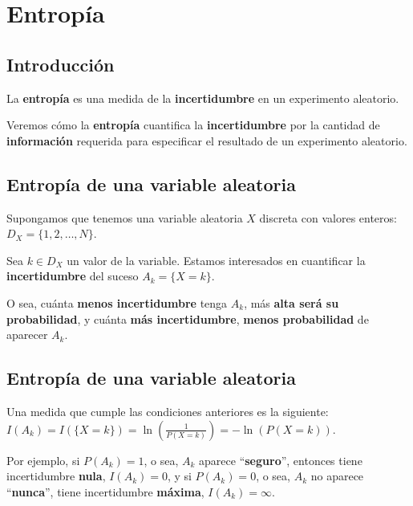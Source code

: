 \documentclass[]{book}
\begin{document}
\hypertarget{entropuxeda}{%
\section{Entropía}\label{entropuxeda}}

\hypertarget{introducciuxf3n-3}{%
\subsection{Introducción}\label{introducciuxf3n-3}}

La \textbf{entropía} es una medida de la \textbf{incertidumbre} en un experimento aleatorio.

Veremos cómo la \textbf{entropía} cuantifica la \textbf{incertidumbre} por la cantidad de \textbf{información} requerida para especificar el resultado de un experimento aleatorio.

\hypertarget{entropuxeda-de-una-variable-aleatoria}{%
\subsection{Entropía de una variable aleatoria}\label{entropuxeda-de-una-variable-aleatoria}}

Supongamos que tenemos una variable aleatoria \(X\) discreta con valores enteros: \(D_X=\{1,2,\ldots,N\}\).

Sea \(k\in D_X\) un valor de la variable. Estamos interesados en cuantificar la \textbf{incertidumbre} del suceso \(A_k =\{X=k\}\).

O sea, cuánta \textbf{menos incertidumbre} tenga \(A_k\), más \textbf{alta será su probabilidad}, y cuánta \textbf{más incertidumbre}, \textbf{menos probabilidad} de aparecer \(A_k\).

\hypertarget{entropuxeda-de-una-variable-aleatoria-1}{%
\subsection{Entropía de una variable aleatoria}\label{entropuxeda-de-una-variable-aleatoria-1}}

Una medida que cumple las condiciones anteriores es la siguiente: \(I(A_k)=I(\{X=k\})=\ln\left(\frac{1}{P(X=k)}\right)=-\ln\left(P(X=k)\right).\)

Por ejemplo, si \(P(A_k)=1\), o sea, \(A_k\) aparece ``\textbf{seguro}'', entonces tiene incertidumbre \textbf{nula}, \(I(A_k)=0\), y si \(P(A_k)=0\), o sea, \(A_k\) no aparece ``\textbf{nunca}'', tiene incertidumbre \textbf{máxima}, \(I(A_k)=\infty\).
\end{document}
